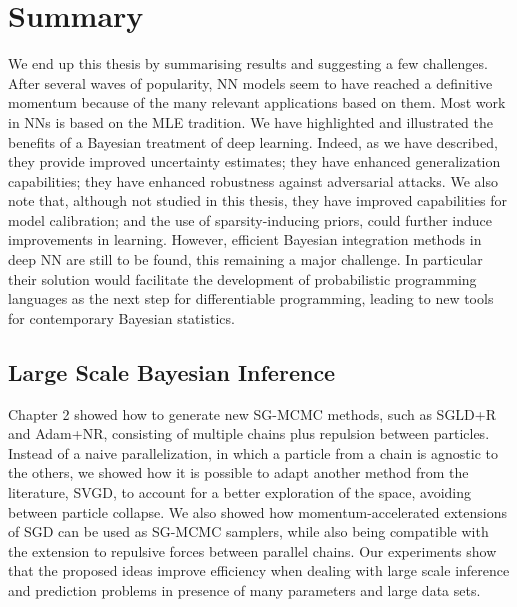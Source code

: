 \section{Summary}

We end up this thesis by summarising results and suggesting a few challenges.
After several waves of popularity, NN models seem to 
have reached a definitive momentum because of the many relevant applications
based on them. Most work in NNs is based on the MLE tradition.
We have highlighted and illustrated the benefits of a Bayesian treatment of deep learning. Indeed, as we have described,
they provide improved uncertainty estimates;
they have enhanced generalization capabilities; 
they have enhanced robustness against adversarial attacks.
We also note that, although not studied in this thesis, 
they have improved capabilities for model calibration;
and the use of sparsity-inducing priors, could further induce 
improvements in learning. 
However, efficient Bayesian integration methods in 
deep NN are 
still to be found, this remaining a major challenge.
In particular their solution would facilitate the
development of probabilistic programming languages \parencite{gordon2014probabilistic,carpenter2017stan,wood2014new}
as the next step for differentiable programming,
leading to new tools for contemporary Bayesian 
statistics.


\subsection{Large Scale Bayesian Inference}\label{sec:conclusion_lsb}

Chapter 2 showed how to generate new SG-MCMC methods, such as SGLD+R and Adam+NR, consisting of multiple chains plus repulsion between  particles. Instead of a naive parallelization, in which a particle from a chain is agnostic to the others, we showed how it is possible to adapt another method from the literature, SVGD, to account for a better exploration of the space, avoiding between particle collapse. We also showed how momentum-accelerated extensions of SGD can be used as SG-MCMC samplers, while also being compatible with the extension to repulsive forces between parallel chains. Our 
experiments show that the proposed ideas improve efficiency when dealing 
with large scale inference and prediction problems in presence of many 
parameters and large data sets.

